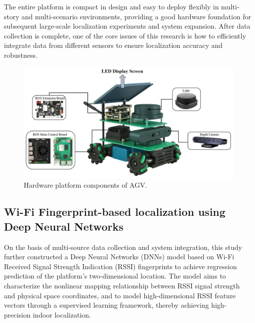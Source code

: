 \documentclass[12pt,a4paper]{article}
\numberwithin{equation}{section}
\begin{document}
The entire platform is compact in design and easy to deploy flexibly in
multi-story and multi-scenario environments, providing a good hardware
foundation for subsequent large-scale localization experiments and system
expansion. After data collection is complete, one of the core issues of this
research is how to efficiently integrate data from different sensors to ensure
localization accuracy and robustness.
\begin{figure}[H]
  \centering
  \includegraphics[width=0.95\linewidth]{images/Hardware.png}
  \caption{Hardware platform components of AGV.}
  \label{fig:Hardware platform components of AGV}
\end{figure}

\subsection{Wi-Fi Fingerprint-based localization using Deep Neural Networks }
On the basis of multi-source data collection and system integration, this study
further constructed a Deep Neural Networks (DNNs) model based on Wi-Fi Received
Signal Strength Indication (RSSI)  fingerprints to achieve regression prediction of the platform's
two-dimensional location. The model aims to characterize the nonlinear mapping
relationship between RSSI signal strength and physical space coordinates, and to
model high-dimensional RSSI feature vectors through a supervised learning
framework, thereby achieving high-precision indoor localization.
\end{document}
